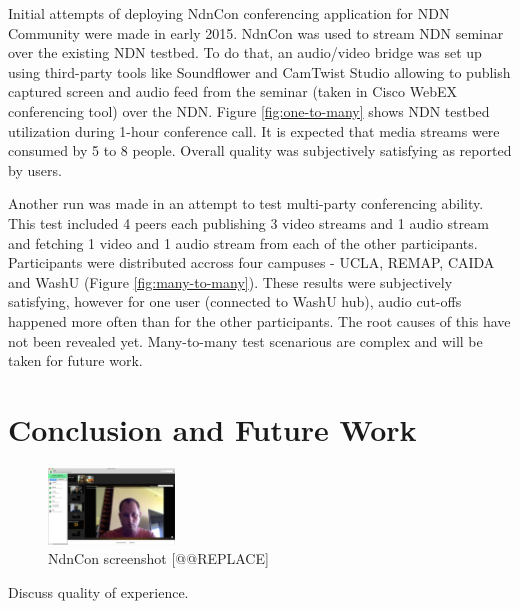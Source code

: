 \documentclass{icn/sig-alternate-2012} %
\newcommand{\ndnconName}{NdnCon}
\begin{document}
Initial attempts of deploying NdnCon conferencing application for NDN Community were made in early 2015. NdnCon was used to stream NDN seminar over the existing NDN testbed. To do that, an audio/video bridge was set up using third-party tools like Soundflower and CamTwist Studio allowing to publish captured screen and audio feed from the seminar (taken in Cisco WebEX conferencing tool) over the NDN. Figure \ref{fig:one-to-many} shows NDN testbed utilization during 1-hour conference call. It is expected that media streams were consumed by 5 to 8 people. Overall quality was subjectively satisfying as reported by users.

Another run was made in an attempt to test multi-party conferencing ability. This test included 4 peers each publishing 3 video streams and 1 audio stream and fetching 1 video and 1 audio stream from each of the other participants. Participants were distributed accross four campuses - UCLA, REMAP, CAIDA and WashU (Figure \ref{fig:many-to-many}). These results were subjectively satisfying, however for one user (connected to WashU hub), audio cut-offs happened more often than for the other participants. The root causes of this have not been revealed yet. Many-to-many test scenarious are complex and will be taken for future work.

\section{Conclusion and Future Work}
\label{sec:conclusion}


\begin{figure}[t!]
\centering
\includegraphics[width=0.3\textwidth]{ndncon}
\caption{\ndnconName{} screenshot [@@REPLACE]}
\label{fig:ndncon}
\end{figure}


Discuss quality of experience. 
\end{document}

